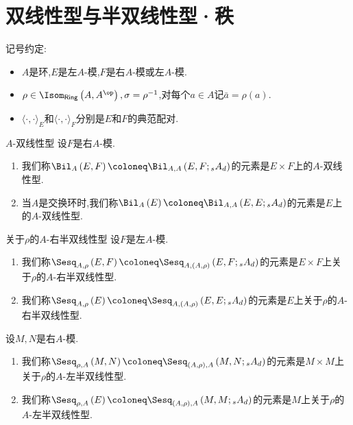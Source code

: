 \section{双线性型与半双线性型·秩}

记号约定:
\begin{itemize}
	\item $A$是环,$E$是左$A$-模,$F$是右$A$-模或左$A$-模.
	\item $\rho\in\Isom_{\mathsf{Ring}}\left(A,A^{\op}\right),\sigma=\rho^{-1}$,对每个$a\in A$记$\bar{a}=\rho\left(a\right)$.
	\item $\langle\cdot,\cdot\rangle_{E}$和$\langle\cdot,\cdot\rangle_{F}$分别是$E$和$F$的典范配对.
\end{itemize}

\begin{definition}{$A$-双线性型}{}
	设$F$是右$A$-模.
	\begin{enumerate}
		\item 我们称$\Bil_{A}\left(E,F\right)\coloneq\Bil_{A,A}\left(E,F;{}_{s}A_{d}\right)$的元素是$E\times F$上的$A$-双线性型.
		\item 当$A$是交换环时,我们称$\Bil_{A}\left(E\right)\coloneq\Bil_{A,A}\left(E,E;{}_{s}A_{d}\right)$的元素是$E$上的$A$-双线性型.
	\end{enumerate}
\end{definition}

\begin{definition}{关于$\rho$的$A$-右半双线性型}{}
	设$F$是左$A$-模.
	\begin{enumerate}
		\item 我们称$\Sesq_{A,\rho}\left(E,F\right)\coloneq\Sesq_{A,(A,\rho)}\left(E,F;{}_{s}A_{d}\right)$的元素是$E\times F$上关于$\rho$的$A$-右半双线性型.
		\item 我们称$\Sesq_{A,\rho}\left(E\right)\coloneq\Sesq_{A,(A,\rho)}\left(E,E;{}_{s}A_{d}\right)$的元素是$E$上关于$\rho$的$A$-右半双线性型.
	\end{enumerate}
\end{definition}

\begin{remark}{}{}
	设$M,N$是右$A$-模.
	\begin{enumerate}
		\item 我们称$\Sesq_{\rho,A}\left(M,N\right)\coloneq\Sesq_{(A,\rho),A}\left(M,N;{}_{s}A_{d}\right)$的元素是$M\times M$上关于$\rho$的$A$-左半双线性型.
		\item 我们称$\Sesq_{\rho,A}\left(E\right)\coloneq\Sesq_{(A,\rho),A}\left(M,M;{}_{s}A_{d}\right)$的元素是$M$上关于$\rho$的$A$-左半双线性型.
	\end{enumerate}
\end{remark}

